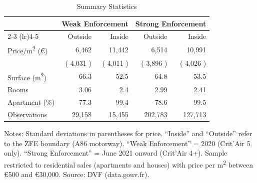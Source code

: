 \begin{table}[H]
\centering
\caption{Summary Statistics}
\begin{threeparttable}
\begin{tabular}{lrrrr}
\toprule
 & \multicolumn{2}{c}{Weak Enforcement} & \multicolumn{2}{c}{Strong Enforcement} \\
\cmidrule(lr){2-3} \cmidrule(lr){4-5}
 & Outside & Inside & Outside & Inside \\
\midrule
Price/m\textsuperscript{2} (\euro{}) &  6,462  &  11,442  &  6,514  &  10,991  \\
 & ( 4,031 ) & ( 4,011 ) & ( 3,896 ) & ( 4,026 ) \\
Surface (m\textsuperscript{2}) &  66.3  &  52.5  &  64.8  &  53.5  \\
Rooms &  3.06  &  2.4  &  2.99  &  2.41  \\
Apartment (\%) &  77.3  &  99.4  &  78.6  &  99.5  \\
\midrule
Observations &  29,158  &  15,455  &  202,783  &  127,713  \\
\bottomrule
\end{tabular}
\begin{tablenotes}[flushleft]
\small
\item Notes: Standard deviations in parentheses for price.  ``Inside'' and ``Outside'' refer to the ZFE boundary (A86 motorway).  ``Weak Enforcement'' = 2020 (Crit'Air 5 only).  ``Strong Enforcement'' = June 2021 onward (Crit'Air 4+).  Sample restricted to residential sales (apartments and houses)  with price per m\textsuperscript{2} between \euro{}500 and \euro{}30,000.  Source: DVF (data.gouv.fr).
\end{tablenotes}
\end{threeparttable}
\label{tab:summary}
\end{table}
